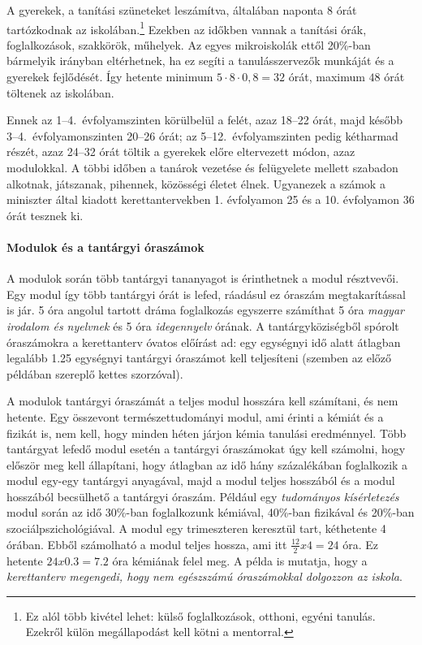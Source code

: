 A gyerekek, a tanítási szüneteket leszámítva, általában naponta 8 órát tartózkodnak az iskolában.\footnote{Ez alól több kivétel lehet: külső foglalkozások, otthoni, egyéni tanulás. Ezekről külön megállapodást kell kötni a mentorral.} Ezekben az időkben vannak a tanítási órák, foglalkozások, szakkörök, műhelyek. Az egyes mikroiskolák ettől 20\%-ban bármelyik irányban eltérhetnek, ha ez segíti a tanulásszervezők munkáját és a gyerekek fejlődését. Így hetente minimum $5 \cdot 8 \cdot 0,8 = 32$ órát, maximum $48$ órát töltenek az iskolában.

Ennek az 1--4.~évfolyamszinten körülbelül a felét, azaz 18--22 órát, majd később 3--4.~évfolyamonszinten 20--26 órát; az 5--12.~évfolyamszinten pedig kétharmad részét, azaz 24--32 órát töltik a gyerekek előre eltervezett módon, azaz modulokkal. A többi időben a tanárok vezetése és felügyelete mellett szabadon alkotnak, játszanak, pihennek, közösségi életet élnek. Ugyanezek a számok a miniszter által kiadott kerettantervekben 1. évfolyamon 25 és a 10. évfolyamon 36 órát tesznek ki.

\paragraph{Modulok és a tantárgyi óraszámok}
A modulok során több tantárgyi tananyagot is érinthetnek a modul résztvevői. Egy modul így több tantárgyi órát is lefed, ráadásul ez óraszám megtakarítással is jár. 5 óra angolul tartott dráma foglalkozás egyszerre számíthat 5 óra \emph{magyar irodalom és nyelvnek} és 5 óra \emph{idegennyelv} órának. A tantárgyköziségből spórolt óraszámokra a kerettanterv óvatos előírást ad: egy egységnyi idő alatt átlagban legalább 1.25 egységnyi tantárgyi óraszámot kell teljesíteni (szemben az előző példában szereplő kettes szorzóval).

A modulok tantárgyi óraszámát a teljes modul hosszára kell számítani, és nem hetente. Egy összevont természettudományi modul, ami érinti a kémiát és a fizikát is, nem kell, hogy minden héten járjon kémia tanulási eredménnyel. Több tantárgyat lefedő modul esetén a tantárgyi óraszámokat úgy kell számolni, hogy először meg kell állapítani, hogy átlagban az idő hány százalékában foglalkozik a modul egy-egy tantárgyi anyagával, majd a modul teljes hosszából és a modul hosszából becsülhető a tantárgyi óraszám. Például egy \emph{tudományos kísérletezés} modul során az idő 30\%-ban foglalkozunk kémiával, 40\%-ban fizikával és 20\%-ban szociálpszichológiával. A modul egy trimeszteren keresztül tart, kéthetente 4 órában. Ebből számolható a modul teljes hossza, ami itt $\frac{12}{2}x4 = 24$ óra. Ez hetente $24x0.3 = 7.2$ óra kémiának felel meg. 
A példa is mutatja, hogy a \emph{kerettanterv megengedi, hogy nem egészszámú óraszámokkal dolgozzon az iskola}. 

